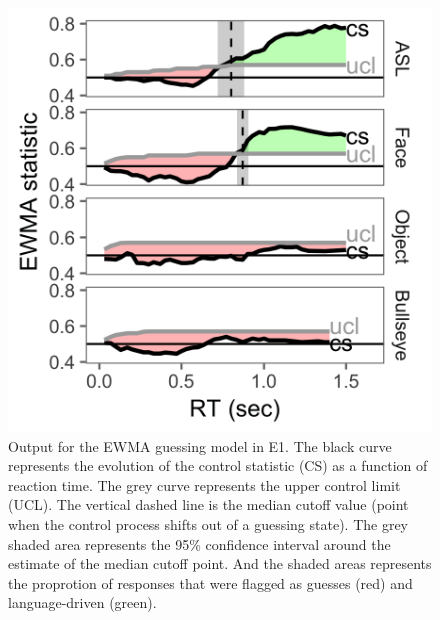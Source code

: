 \documentclass[10pt, letterpaper]{article}
\newenvironment{CodeChunk}{}{}
\begin{document}
\begin{CodeChunk}
\begin{figure}[t]

{\centering \includegraphics{figs/e1_control_chart-1} 

}

\caption[Output for the EWMA guessing model in E1]{Output for the EWMA guessing model in E1. The black curve represents the evolution of the control statistic (CS) as a function of reaction time. The grey curve represents the upper control limit (UCL). The vertical dashed line is the median cutoff value (point when the control process shifts out of a guessing state). The grey shaded area represents the 95\% confidence interval around the estimate of the median cutoff point. And the shaded areas represents the proprotion of responses that were flagged as guesses (red) and language-driven (green).}\label{fig:e1_control_chart}
\end{figure}
\end{CodeChunk}
\end{document}
